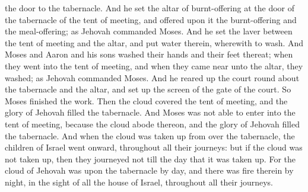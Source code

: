 the door to the tabernacle. And he set the altar of burnt-offering at the door of the tabernacle of the tent of meeting, and offered upon it the burnt-offering and the meal-offering; as Jehovah commanded Moses. And he set the laver between the tent of meeting and the altar, and put water therein, wherewith to wash. And Moses and Aaron and his sons washed their hands and their feet thereat; when they went into the tent of meeting, and when they came near unto the altar, they washed; as Jehovah commanded Moses. And he reared up the court round about the tabernacle and the altar, and set up the screen of the gate of the court. So Moses finished the work.  Then the cloud covered the tent of meeting, and the glory of Jehovah filled the tabernacle. And Moses was not able to enter into the tent of meeting, because the cloud abode thereon, and the glory of Jehovah filled the tabernacle. And when the cloud was taken up from over the tabernacle, the children of Israel went onward, throughout all their journeys: but if the cloud was not taken up, then they journeyed not till the day that it was taken up. For the cloud of Jehovah was upon the tabernacle by day, and there was fire therein by night, in the sight of all the house of Israel, throughout all their journeys. 